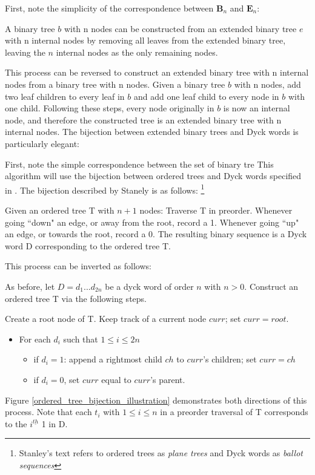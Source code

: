 First, note the simplicity of the correspondence between $\mathbf{B}_n$ and $\mathbf{E}_n$:

A binary tree $b$ with n nodes can be constructed from an extended binary tree $e$ with n internal nodes by removing all leaves from the extended binary tree, leaving the $n$ internal nodes as the only remaining nodes.

This process can be reversed to construct an extended binary tree with n internal nodes from a binary tree with n nodes. Given a binary tree $b$ with n nodes, add two leaf children to every leaf in $b$ and add one leaf child to every node in $b$ with one child. Following these steps, every node originally in $b$ is now an internal node, and therefore the constructed tree is an extended binary tree with n internal nodes.
The bijection between extended binary trees and Dyck words is particularly elegant: 

First, note the simple correspondence between the set of binary tre
This algorithm will use the bijection between ordered trees and Dyck words specified in \cite{stanley2015catalan}. The bijection described by Stanely is as follows:
\footnote{ Stanley's text refers to ordered trees as \emph{plane trees} and Dyck words as \emph{ballot sequences}} 


Given an ordered tree T with $n+1$ nodes: Traverse T in preorder.  Whenever going ``down" an edge, or away from the root, record a 1.  Whenever going ``up" an edge, or towards the root, record a 0.  The resulting binary sequence is a Dyck word D corresponding to the ordered tree T. 

This process can be inverted as follows: 

As before, let $D=d_1...d_{2n}$ be a dyck word of order $n$ with $n > 0$. Construct an ordered tree T via the following steps. 

Create a root node of T.  Keep track of a current node $curr$; set $curr=root$.

\begin{itemize}
    \item For each $d_i$ such that $1 \le i \le 2n$ %
	\begin{itemize}
	    \item if $d_i=1$: append a rightmost child $ch$ to $curr$'s children; set $curr=ch$
	    \item if $d_i=0$, set $curr$ equal to $curr$'s parent.
	\end{itemize}

\end{itemize}
Figure \ref{ordered_tree_bijection_illustration} demonstrates both directions of this process. Note that each $t_i$ with $1 \le i \le n$ in a preorder traversal of T corresponds to the $i^{\underline{th}}$ 1 in D.

